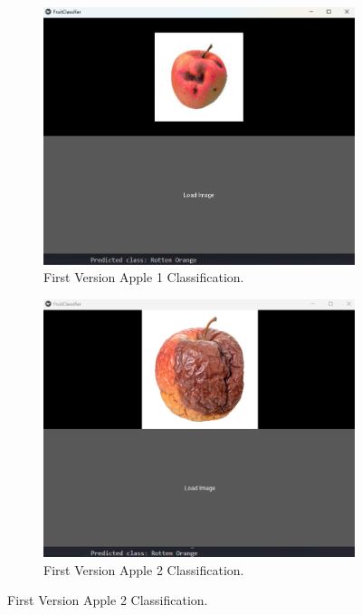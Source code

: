 \documentclass[conference]{IEEEtran}
\begin{document}
\begin{figure}[h]
    \centering
    \begin{subfigure}[b]{0.48\linewidth}
        \centering
        \includegraphics[width=\linewidth]{1layer appelR1.png}
        \caption{First Version Apple 1 Classification.}
        \label{figFA}
    \end{subfigure}
    \hfill
    \begin{subfigure}[b]{0.48\linewidth}
        \centering
        \includegraphics[width=\linewidth]{1layer appelR2.png}
        \caption{First Version Apple 2 Classification.}

\end{subfigure}
\end{figure}
\end{document}

